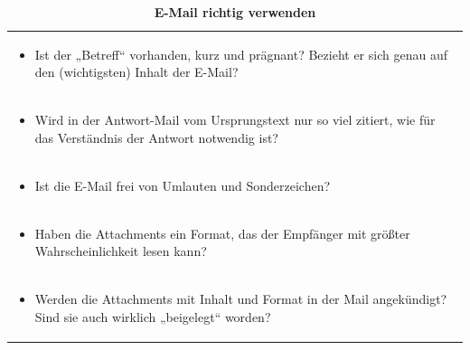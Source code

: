 \documentclass[]{book}
\providecommand{\tightlist}{%
  \setlength{\itemsep}{0pt}\setlength{\parskip}{0pt}}
\theoremstyle{definition}
\theoremstyle{definition}
\theoremstyle{definition}
\theoremstyle{remark}
\begin{document}
\begin{longtable}[]{@{}l@{}}
\caption{\textbf{\label{tab:email} E-Mail richtig verwenden}}\tabularnewline
\toprule
\begin{minipage}[t]{0.97\columnwidth}\raggedright\strut
\begin{itemize}
\tightlist
\item
  Ist der „Betreff`` vorhanden, kurz und prägnant? Bezieht er sich genau
  auf den (wichtigsten) Inhalt der E-Mail?\vspace{-6mm}
\end{itemize}\strut
\end{minipage}\tabularnewline
\begin{minipage}[t]{0.97\columnwidth}\raggedright\strut
\begin{itemize}
\tightlist
\item
  Wird in der Antwort-Mail vom Ursprungstext nur so viel zitiert, wie
  für das Verständnis der Antwort notwendig ist? \vspace{-6mm}
\end{itemize}\strut
\end{minipage}\tabularnewline
\begin{minipage}[t]{0.97\columnwidth}\raggedright\strut
\begin{itemize}
\tightlist
\item
  Ist die E-Mail frei von Umlauten und Sonderzeichen?\vspace{-6mm}
\end{itemize}\strut
\end{minipage}\tabularnewline
\begin{minipage}[t]{0.97\columnwidth}\raggedright\strut
\begin{itemize}
\tightlist
\item
  Haben die Attachments ein Format, das der Empfänger mit größter
  Wahrscheinlichkeit lesen kann? \vspace{-6mm}
\end{itemize}\strut
\end{minipage}\tabularnewline
\begin{minipage}[t]{0.97\columnwidth}\raggedright\strut
\begin{itemize}
\tightlist
\item
  Werden die Attachments mit Inhalt und Format in der Mail angekündigt?
  Sind sie auch wirklich „beigelegt`` worden? \vspace{-6mm}
\end{itemize}\strut
\end{minipage}\tabularnewline

\end{longtable}
\end{document}
